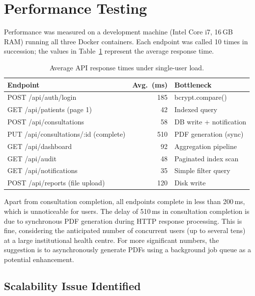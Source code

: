 \section{Performance Testing}

Performance was measured on a development machine (Intel Core i7,
16\,GB RAM) running all three Docker containers. Each endpoint was
called 10 times in succession; the values in Table~\ref{tab:perf}
represent the average response time.

\begin{table}[htbp]
  \centering
  \caption{Average API response times under single-user load.}
  \label{tab:perf}
  \begin{tabular}{lrl}
    \hline
    \textbf{Endpoint} & \textbf{Avg.\ (ms)} & \textbf{Bottleneck} \\
    \hline
    POST /api/auth/login              & 185 & bcrypt.compare() \\
    GET  /api/patients (page 1)       &  42 & Indexed query \\
    POST /api/consultations           &  58 & DB write + notification \\
    PUT  /api/consultations/:id (complete) & 510 & PDF generation (sync) \\
    GET  /api/dashboard               &  92 & Aggregation pipeline \\
    GET  /api/audit                   &  48 & Paginated index scan \\
    GET  /api/notifications           &  35 & Simple filter query \\
    POST /api/reports (file upload)   & 120 & Disk write \\
    \hline
  \end{tabular}
\end{table}

Apart from consultation completion, all endpoints complete in less
than 200\,ms, which is unnoticeable for users. The delay of
510\,ms in consultation completion is due to synchronous PDF
generation during HTTP response processing. This is fine, considering
the anticipated number of concurrent users (up to several tens) at a
large institutional health centre. For more significant numbers, the
suggestion is to asynchronously generate PDFs using a background job
queue as a potential enhancement.

\subsection{Scalability Issue Identified}

